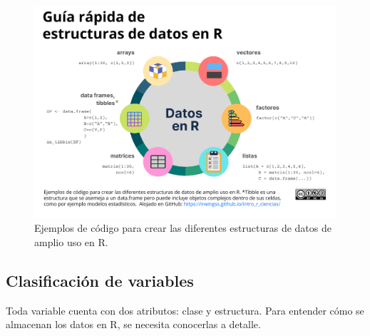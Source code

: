 \documentclass[
]{article}
\theoremstyle{definition}
\theoremstyle{definition}
\theoremstyle{definition}
\theoremstyle{definition}
\theoremstyle{remark}
\begin{document}
\begin{figure}

{\centering \includegraphics[width=1\linewidth]{figs/elaboradas/Estructuras 2} 

}

\caption{Ejemplos de código para crear las diferentes estructuras de datos de amplio uso en R.}\label{fig:figura42}
\end{figure}

\hypertarget{clasificaciuxf3n-de-variables}{%
\subsection{Clasificación de variables}\label{clasificaciuxf3n-de-variables}}

Toda variable cuenta con dos atributos: clase y estructura. Para entender cómo se almacenan los datos en R, se necesita conocerlas a detalle.
\end{document}
